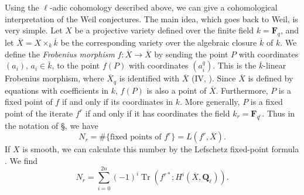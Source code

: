 {\par\medskip
{}\par\medskip
\noindent Using the $\ell$-adic cohomology described above, we can give a cohomological interpretation of the Weil conjectures. The main idea, which goes back to Weil, is very simple. Let $X$ be a projective variety defined over the finite field $k=\mathbf F_q$, and let $\overline X=X\times_k\overline k$ be the corresponding variety over the algebraic closure $\overline k$ of $k$. We define the \emph{Frobenius morphism} $f\colon\overline X\to\overline X$ by sending the point $P$ with coordinates $(a_i)$, $a_i\in\overline k$, to the point $f(P)$ with coordinates $(a_i^q)$. This is the $\overline k$-linear Frobenius morphism, where $\overline X_q$ is identified with $\overline X$ (IV, ). Since $\overline X$ is defined by equations with coefficients in $k$, $f(P)$ is also a point of $\overline X$. Furthermore, $P$ is a fixed point of $f$ if and only if its coordinates  in $k$. More generally, $P$ is a fixed point of the iterate $f^r$ if and only if it has coordinates  the field $k_r=\mathbf F_{q^r}$. Thus in the notation of \S{}, we have
\[
 N_r=\#\{\text{fixed points of }f^r\}=L(f^r,\overline X).
\]
If $X$ is smooth, we can calculate this number by the Lefschetz fixed-point formula . We find
\[
 N_r=\sum_{i=0}^{2n}(-1)^i\operatorname{Tr}(f^{r*};H^i(\overline X,\mathbf Q_\ell)).
\]
}
